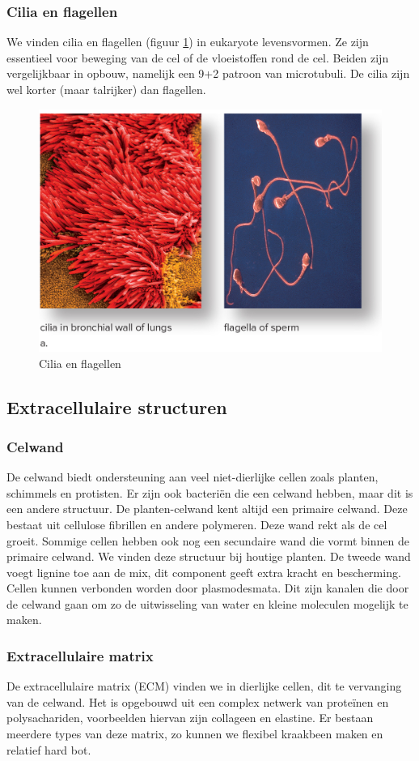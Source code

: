\documentclass[a4paper,kul]{kulakarticle} %
\begin{document}
\subsubsection{Cilia en flagellen}
We vinden cilia en flagellen (figuur \ref{fig:ciliaenflagellen}) in eukaryote levensvormen. Ze zijn essentieel voor beweging van de cel of de vloeistoffen rond de cel. Beiden zijn vergelijkbaar in opbouw, namelijk een 9+2 patroon van microtubuli. De cilia zijn wel korter (maar talrijker) dan flagellen.
\begin{figure}[h]
	\centering
	\includegraphics[width=0.7\linewidth]{Cilia_en_Flagellen}
	\caption[Cilia en flagellen]{Cilia en flagellen}
	\label{fig:ciliaenflagellen}
\end{figure}

\subsection{Extracellulaire structuren}
\subsubsection{Celwand}
De celwand biedt ondersteuning aan veel niet-dierlijke cellen zoals planten, schimmels en protisten. Er zijn ook bacteriën die een celwand hebben, maar dit is een andere structuur. De planten-celwand kent  altijd een primaire celwand. Deze bestaat uit cellulose fibrillen en andere polymeren. Deze wand rekt als de cel groeit. Sommige cellen hebben ook nog een secundaire wand die vormt binnen de primaire celwand. We vinden deze structuur bij houtige planten. De tweede wand voegt lignine toe aan de mix, dit component geeft extra kracht en bescherming. Cellen kunnen verbonden worden door plasmodesmata. Dit zijn kanalen die door de celwand gaan om zo de uitwisseling van water en kleine moleculen mogelijk te maken.
\subsubsection{Extracellulaire matrix}
De extracellulaire matrix (ECM) vinden we in dierlijke cellen, dit te vervanging van de celwand. Het is opgebouwd uit een complex netwerk van proteïnen en polysachariden, voorbeelden hiervan zijn collageen en elastine. Er bestaan meerdere types van deze matrix, zo kunnen we flexibel kraakbeen maken en relatief hard bot. 
\end{document}
